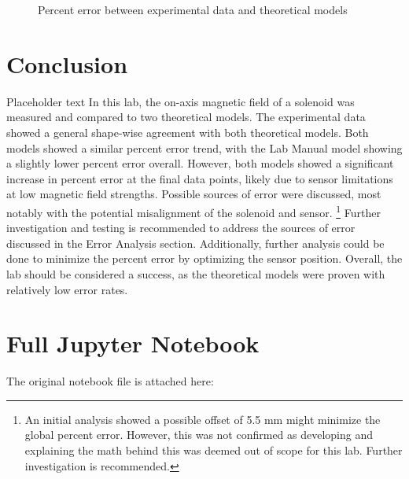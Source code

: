 \documentclass[11pt]{article}
\begin{document}
\begin{figure}[H]
    \centering
\caption{Percent error between experimental data and theoretical models}
\label{fig:percent-error}
\end{figure}

\section{Conclusion}
Placeholder text
In this lab, the on-axis magnetic field of a solenoid was measured and compared to two theoretical models.
The experimental data showed a general shape-wise agreement with both theoretical models.
Both models showed a similar percent error trend, with the Lab Manual model showing a slightly lower percent error overall.
However, both models showed a significant increase in percent error at the final data points, likely due to sensor limitations at low magnetic field strengths.
Possible sources of error were discussed, most notably with the potential misalignment of the solenoid and sensor.
\footnote{An initial analysis showed a possible offset of 5.5 mm might minimize the global percent error. However, this was not confirmed as developing and explaining the math behind this was deemed out of scope for this lab. Further investigation is recommended.}
Further investigation and testing is recommended to address the sources of error discussed in the Error Analysis section.
Additionally, further analysis could be done to minimize the percent error by optimizing the sensor position.
Overall, the lab should be considered a success, as the theoretical models were proven with relatively low error rates.

\appendix
\section{Full Jupyter Notebook}

\bigskip
\noindent The original notebook file is attached here: 
\end{document}
